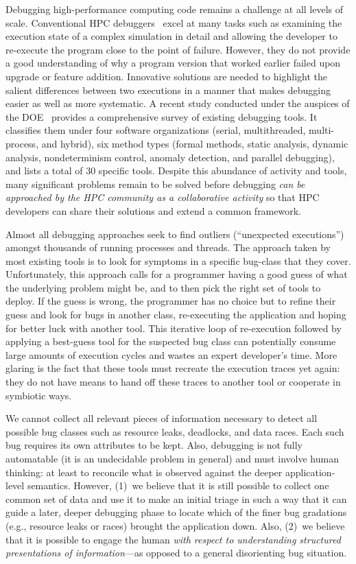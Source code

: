 ﻿Debugging high-performance computing code
remains a challenge at all levels of scale.
%
Conventional HPC debuggers~\cite{allinea-ddt,roguewave,others}
excel at many tasks such as examining the execution
state of a complex simulation in detail
and allowing the developer to re-execute
the program close to the point of failure.
%
However, they do not provide a good understanding
of why a program version that worked earlier
failed upon upgrade or feature addition.
%
Innovative solutions are needed to highlight the
salient differences between two executions in a manner
that makes debugging easier as well as more systematic.
%
A recent study conducted under the auspices of the
DOE~\cite{DBLP:journals/corr/GopalakrishnanH17}
provides a comprehensive survey
of existing debugging tools.
%
It classifies them under
four software organizations (serial, multithreaded,
multi-process, and hybrid), six
method types (formal methods, static analysis, dynamic
analysis, nondeterminism control, anomaly detection,
and parallel debugging), and lists a total of 30 specific
tools.
%
Despite this abundance of activity and tools, many
significant problems remain to be solved before debugging
{\em can be approached by the HPC community as a collaborative
activity} so that HPC developers can share their solutions
and extend a common framework.

Almost all debugging approaches seek to find outliers (``unexpected
executions'') amongst thousands of running processes and threads.
%
The approach taken by most existing tools is to
look for symptoms in a specific bug-class that they cover.
%
Unfortunately,
this approach calls for a programmer having a good guess of what
the underlying problem might be,
and to then pick the right set of tools to deploy.
%
If the guess is wrong, the programmer has no choice but to
refine their guess
and look for bugs in another class,
re-executing the application and hoping for
better luck with another tool.
%
This iterative loop of re-execution followed by applying a
best-guess tool for the suspected bug class can potentially consume
large amounts of execution cycles and wastes an
expert developer's time.
%
More glaring is the fact that these tools must recreate the
execution traces yet again: they do not have means to hand off
these traces to another tool or cooperate in symbiotic ways.



We cannot collect all relevant pieces of information
necessary to detect all possible bug classes such as
resource leaks, deadlocks, and data races.
%
Each such bug requires its own attributes to be kept.
%
Also, debugging is not fully automatable (it is
an undecidable problem in general) and must involve human thinking:
at least to reconcile what is observed against the deeper application-level semantics.
%
However, (1)~we believe that it is still possible to collect one common set
of data and use it to make an initial triage in such
a way that it can guide a later, deeper debugging phase to locate
which of the finer bug gradations (e.g., resource leaks or races) brought
the application down.
%
Also, (2)~we believe that it is possible to engage the human {\em with respect
to understanding structured presentations of information}---as opposed to a general
disorienting bug situation.


